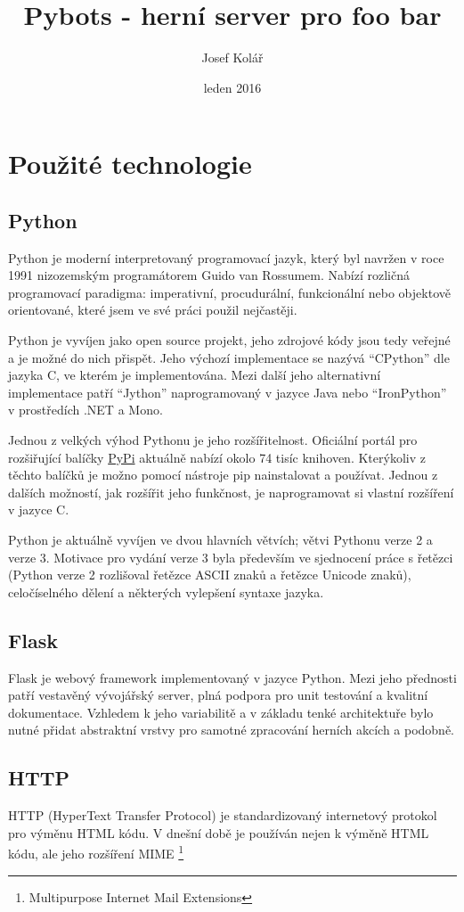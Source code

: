 \documentclass[12pt,titlepage,a4paper]{article}
\begin{document}
\title{Pybots - herní server pro foo bar}
\author{Josef Kolář}
\date{leden 2016}
\maketitle

\section{Použité technologie}

\subsection{Python}

Python je moderní interpretovaný programovací jazyk, který byl navržen v roce 1991 nizozemským programátorem Guido van Rossumem. Nabízí rozličná programovací paradigma: imperativní, procudurální, funkcionální nebo objektově orientované, které jsem ve své práci použil nejčastěji.

Python je vyvíjen jako open source projekt, jeho zdrojové kódy jsou tedy veřejné a je možné do nich přispět. Jeho výchozí implementace se nazývá ``CPython'' dle jazyka C, ve kterém je implementována. Mezi další jeho alternativní implementace patří ``Jython'' naprogramovaný v jazyce Java nebo ``IronPython'' v prostředích .NET a Mono.

Jednou z velkých výhod Pythonu je jeho rozšířitelnost. Oficiální 
portál pro rozšiřující balíčky 
\href{https:\/\/pypi.python.org\/pypi}{PyPi} aktuálně nabízí okolo 74 tisíc knihoven. Kterýkoliv z těchto balíčků je možno pomocí nástroje pip nainstalovat a používat. Jednou z dalších možností, jak rozšířit jeho funkčnost, je naprogramovat si vlastní rozšíření v jazyce C.

Python je aktuálně vyvíjen ve dvou hlavních větvích; větvi Pythonu verze 2 a verze 3. Motivace pro vydání verze 3 byla především ve sjednocení práce s řetězci (Python verze 2 rozlišoval řetězce ASCII znaků a řetězce Unicode znaků), celočíselného dělení a některých vylepšení syntaxe jazyka.

\subsection{Flask}

Flask je webový framework implementovaný v jazyce Python. Mezi jeho 
přednosti patří vestavěný vývojářský server, plná podpora pro 
unit testování a kvalitní dokumentace. Vzhledem k jeho variabilitě 
a v základu tenké architektuře bylo nutné přidat abstraktní 
vrstvy pro samotné zpracování herních akcích a podobně.

\subsection{HTTP}

HTTP (HyperText Transfer Protocol) je standardizovaný internetový 
protokol pro výměnu HTML kódu. V dnešní době je používán nejen 
k výměně HTML kódu, ale jeho rozšíření MIME \footnote{Multipurpose Internet Mail Extensions}
\end{document}
